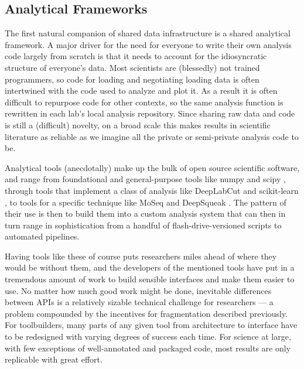\documentclass[notoc]{tufte-book}
\begin{document}
\subsection{Analytical Frameworks}

The first natural companion of shared data infrastructure is a shared
analytical framework. A major driver for the need for everyone to write
their own analysis code largely from scratch is that it needs to account
for the idiosyncratic structure of everyone's data. Most scientists are
(blessedly) not trained programmers, so code for loading and negotiating
loading data is often intertwined with the code used to analyze and plot
it. As a result it is often difficult to repurpose code for other
contexts, so the same analysis function is rewritten in each lab's local
analysis repository. Since sharing raw data and code is still a
(difficult) novelty, on a broad scale this makes results in scientific
literature as reliable as we imagine all the private or semi-private
analysis code to be.

Analytical tools (anecdotally) make up the bulk of open source
scientific software, and range from foundational and general-purpose
tools like numpy \citep{harrisArrayProgrammingNumPy2020}  and
scipy \citep{virtanenSciPyFundamentalAlgorithms2020} , through
tools that implement a class of analysis like DeepLabCut \citep{mathisDeepLabCutMarkerlessPose2018a}  and scikit-learn \citep{pedregosaScikitlearnMachineLearning2011} , to tools for a specific
technique like MoSeq \citep{wiltschkoRevealingStructurePharmacobehavioral2020}  and DeepSqueak
\citep{coffeyDeepSqueakDeepLearningbased2019} . The pattern of
their use is then to build them into a custom analysis system that can
then in turn range in sophistication from a handful of
flash-drive-versioned scripts to automated pipelines.

Having tools like these of course puts researchers miles ahead of where
they would be without them, and the developers of the mentioned tools
have put in a tremendous amount of work to build sensible interfaces and
make them easier to use. No matter how much good work might be done,
inevitable differences between APIs is a relatively sizable technical
challenge for researchers --- a problem compounded by the incentives for
fragmentation described previously. For toolbuilders, many parts of any
given tool from architecture to interface have to be redesigned with
varying degrees of success each time. For science at large, with few
exceptions of well-annotated and packaged code, most results are only
replicable with great effort.
\end{document}
